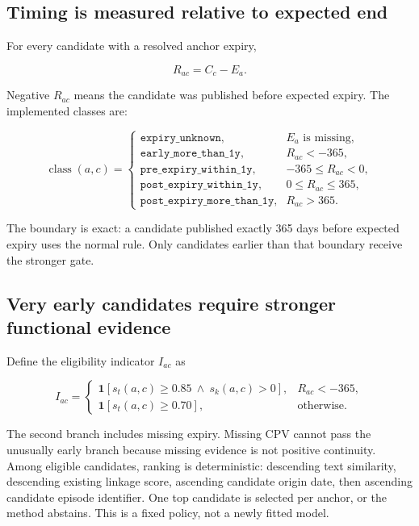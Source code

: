 \documentclass[11pt,a4paper]{article}
\begin{document}
\subsection{Timing is measured relative to expected end}

For every candidate with a resolved anchor expiry,

\begin{equation}
  R_{ac}=C_c-E_a.
  \label{eq:relative}
\end{equation}

Negative $R_{ac}$ means the candidate was published before expected expiry. The
implemented classes are:

\begin{equation}
\operatorname{class}(a,c)=
\begin{cases}
\texttt{expiry\_unknown}, & E_a\text{ is missing},\\
\texttt{early\_more\_than\_1y}, & R_{ac}<-365,\\
\texttt{pre\_expiry\_within\_1y}, & -365\le R_{ac}<0,\\
\texttt{post\_expiry\_within\_1y}, & 0\le R_{ac}\le365,\\
\texttt{post\_expiry\_more\_than\_1y}, & R_{ac}>365.
\end{cases}
\end{equation}

The boundary is exact: a candidate published exactly 365 days before expected expiry
uses the normal rule. Only candidates earlier than that boundary receive the stronger
gate.

\subsection{Very early candidates require stronger functional evidence}

Define the eligibility indicator $I_{ac}$ as

\begin{equation}
I_{ac}=
\begin{cases}
\mathbf{1}\!\left[s_t(a,c)\ge0.85\ \land\ s_k(a,c)>0\right],
  & R_{ac}<-365,\\
\mathbf{1}\!\left[s_t(a,c)\ge0.70\right],
  & \text{otherwise}.
\end{cases}
\label{eq:eligibility}
\end{equation}

The second branch includes missing expiry. Missing CPV cannot pass the unusually
early branch because missing evidence is not positive continuity. Among eligible
candidates, ranking is deterministic: descending text similarity, descending
existing linkage score, ascending candidate origin date, then ascending candidate
episode identifier. One top candidate is selected per anchor, or the method abstains.
This is a fixed policy, not a newly fitted model.
\end{document}
